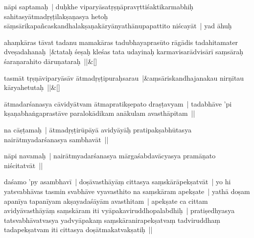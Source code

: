 \documentclass[article,12pt,a4paper]{memoir}%
\newcounter{parCount}
\begin{document}
	  
	  \pstart \leavevmode%
	\label{thakur75-2.20}nāpi saptamaḥ | duḥkhe viparyāsatṛṣṇāpravṛttiśaktikarmabhiḥ sahitasyātmadṛṣṭilakṣaṇasya hetoḥ sāṃsārikapañcaskandhalakṣaṇakāryānyathānupapattito niścayāt | yad āhuḥ 
	{}
	\pend%
      
	    
	    \stanza[\smallbreak]
	  ahaṃkāras tāvat tadanu mamakāras tadubhayaprasūto rāgādis tadahitamater dveṣadahanaḥ |&tataḥ śeṣaḥ kleśas tata udayinaḥ karmavisarādvisārī saṃsāraḥ śaraṇarahito dāruṇataraḥ ||\&[\smallbreak]
	  
	  
	  
	    
	    \stanza[\smallbreak]
	  tasmāt tṛṣṇāviparyāsāv ātmadṛṣṭipuraḥsarau |&aṃsāriskandhajanakau nirṇītau kāryahetutaḥ ||\&[\smallbreak]
	  
	  
	  

	  
	  \pstart \leavevmode%
	\label{thakur75-2.29}ātmadarśanasya cāvidyātvam ātmapratikṣepato draṣṭavyam | tadabhāve 'pi kṣaṇabhaṅgaprastāve paralokādikam anākulam avasthāpitam || 
	{}
	\pend%
      

	  
	  \pstart \leavevmode%
	\label{thakur75-2.31}na cāṣṭamaḥ | ātmadṛṣṭirūpāyā avidyāyāḥ pratipakṣabhūtasya nairātmyadarśanasya sambhavāt || 
	{}
	\pend%
      

	  
	  \pstart \leavevmode%
	\label{thakur75-3.1}nāpi navamaḥ | nairātmyadarśanasya mārgaśabdavācyasya pramāṇato niścitatvāt || 
	{}
	\pend%
      

	  
	  \pstart \leavevmode%
	\label{thakur75-3.2}daśamo 'py asambhavī | doṣāvasthāyāṃ cittasya saṃskārāpekṣatvāt | yo hi yatsvabhāvas tasmin svabhāve vyavasthito na saṃskāram apekṣate | yathā doṣam apanīya tapanīyam akṣayadaśāyām avasthitam | apekṣate ca cittam avidyāvasthāyāṃ saṃskāram iti vyāpakaviruddhopalabdhiḥ | pratiṣedhyasya tatsvabhāvatvasya yadvyāpakaṃ saṃskāranirapekṣatvaṃ tadviruddhaṃ tadapekṣatvam iti cittasya doṣātmakatvakṣatiḥ || 
	{}
	\pend%
      
\end{document}

